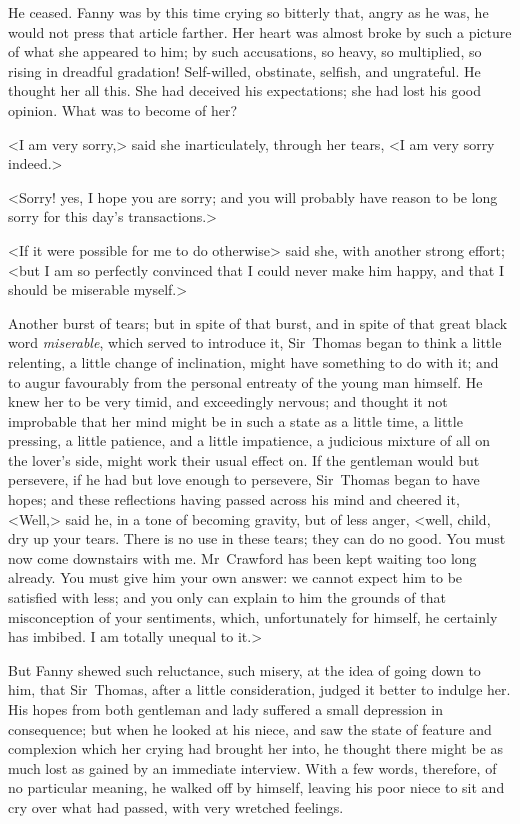 He ceased. Fanny was by this time crying so bitterly that, angry as he was, he would not press that article farther. Her heart was almost broke by such a picture of what she appeared to him; by such accusations, so heavy, so multiplied, so rising in dreadful gradation! Self-willed, obstinate, selfish, and ungrateful. He thought her all this. She had deceived his expectations; she had lost his good opinion. What was to become of her?

<I am very sorry,> said she inarticulately, through her tears, <I am very sorry indeed.>

<Sorry! yes, I hope you are sorry; and you will probably have reason to be long sorry for this day's transactions.>

<If it were possible for me to do otherwise> said she, with another strong effort; <but I am so perfectly convinced that I could never make him happy, and that I should be miserable myself.>

Another burst of tears; but in spite of that burst, and in spite of that great black word \textit{miserable}, which served to introduce it, Sir~Thomas began to think a little relenting, a little change of inclination, might have something to do with it; and to augur favourably from the personal entreaty of the young man himself. He knew her to be very timid, and exceedingly nervous; and thought it not improbable that her mind might be in such a state as a little time, a little pressing, a little patience, and a little impatience, a judicious mixture of all on the lover's side, might work their usual effect on. If the gentleman would but persevere, if he had but love enough to persevere, Sir~Thomas began to have hopes; and these reflections having passed across his mind and cheered it, <Well,> said he, in a tone of becoming gravity, but of less anger, <well, child, dry up your tears. There is no use in these tears; they can do no good. You must now come downstairs with me. Mr~Crawford has been kept waiting too long already. You must give him your own answer: we cannot expect him to be satisfied with less; and you only can explain to him the grounds of that misconception of your sentiments, which, unfortunately for himself, he certainly has imbibed. I am totally unequal to it.>

But Fanny shewed such reluctance, such misery, at the idea of going down to him, that Sir~Thomas, after a little consideration, judged it better to indulge her. His hopes from both gentleman and lady suffered a small depression in consequence; but when he looked at his niece, and saw the state of feature and complexion which her crying had brought her into, he thought there might be as much lost as gained by an immediate interview. With a few words, therefore, of no particular meaning, he walked off by himself, leaving his poor niece to sit and cry over what had passed, with very wretched feelings.

